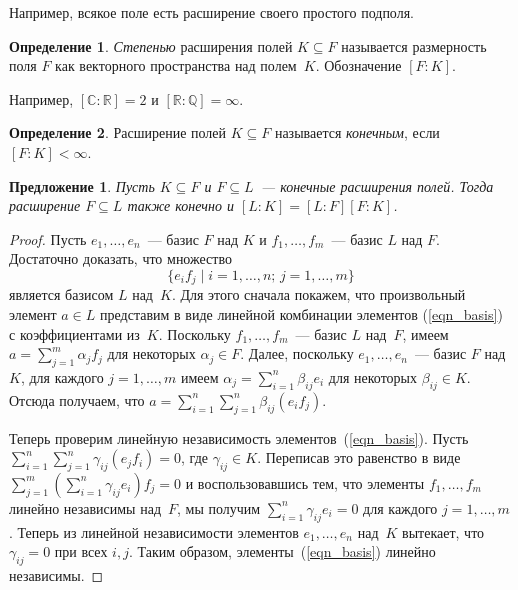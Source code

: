 \documentclass[a4paper,10pt]{amsart}
\def\CC{{\mathbb C}}%
\def\RR{{\mathbb R}}%
\def\QQ{{\mathbb Q}}%
\newtheorem{proposition}{Предложение}
\theoremstyle{definition}
\newtheorem{definition}{Определение}
\theoremstyle{remark}
\begin{document}
Например, всякое поле есть расширение своего простого подполя.

\begin{definition}
{\it Степенью} расширения полей $K \subseteq F$ называется
размерность поля $F$ как векторного пространства над полем~$K$.
Обозначение $[F : K]$.
\end{definition}

Например, $[\CC : \RR] = 2$ и $[\RR : \QQ] = \infty$.

\begin{definition}
Расширение полей $K\subseteq F$ называется {\it конечным}, если $[F
: K] < \infty$.
\end{definition}

\begin{proposition}
Пусть $K\subseteq F$ и $F\subseteq L$~--- конечные расширения полей.
Тогда расширение $F\subseteq L$ также конечно и $[L:K]=[L:F][F:K]$.
\end{proposition}

\begin{proof}
Пусть $e_1,\ldots,e_n$~--- базис $F$ над $K$ и $f_1,\ldots,f_m$~---
базис $L$ над $F$. Достаточно доказать, что множество
\begin{equation} \label{eqn_basis}
\lbrace e_i f_j \mid i = 1,\ldots,n;\, j = 1,\ldots, m \rbrace
\end{equation}
является базисом $L$ над~$K$. Для этого сначала покажем, что
произвольный элемент $a\in L$ представим в виде линейной комбинации
элементов (\ref{eqn_basis}) с коэффициентами из~$K$. Поскольку $f_1,
\ldots, f_m$~--- базис $L$ над~$F$, имеем $a = \sum \limits_{j=1}^m
\alpha_j f_j$ для некоторых $\alpha_j \in F$. Далее, поскольку $e_1,
\ldots, e_n$~--- базис $F$ над~$K$, для каждого $j = 1, \ldots, m$
имеем $\alpha_j = \sum \limits_{i = 1}^n \beta_{ij} e_i$ для
некоторых $\beta_{ij}\in K$. Отсюда получаем, что $a = \sum
\limits_{i=1}^n \sum \limits_{j=1}^n \beta_{ij} (e_if_j)$.

Теперь проверим линейную независимость элементов~(\ref{eqn_basis}).
Пусть $\sum \limits_{i=1}^n \sum \limits_{j=1}^n \gamma_{ij}
(e_jf_i) = 0$, где $\gamma_{ij} \in K$. Переписав это равенство в
виде $\sum \limits_{j=1}^m (\sum \limits_{i=1}^n \gamma_{ij}e_i)f_j
= 0$ и воспользовавшись тем, что элементы $f_1, \ldots, f_m$ линейно
независимы над~$F$, мы получим $\sum \limits_{i=1}^n \gamma_{ij}e_i
= 0$ для каждого $j = 1, \ldots, m$. Теперь из линейной
независимости элементов $e_1, \ldots, e_n$ над~$K$ вытекает, что
$\gamma_{ij} = 0$ при всех $i,j$. Таким образом,
элементы~(\ref{eqn_basis}) линейно независимы.
\end{proof}
\end{document}

